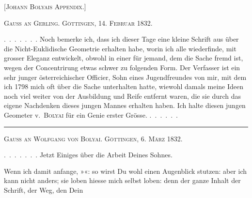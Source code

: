 \clearpage
{}%
\begin{center}\Large\textsc{[Johann Bolyais Appendix.]}\end{center}
\bigskip
\begin{center}\textsc{Gauss an Gerling. Göttingen, 14. Februar 1832.}\end{center}
\mbox{.\ .\ .\ .\ .\ .\ .} Noch bemerke ich, dass ich dieser Tage eine kleine Schrift aus  über die Nicht-Euklidische Geometrie erhalten habe, worin ich alle  wiederfinde, mit grosser Eleganz entwickelt, obwohl in einer für jemand, dem die Sache fremd ist, wegen der Concentrirung etwas schwer zu folgenden Form. Der Verfasser ist ein sehr junger österreichischer Officier, Sohn eines Jugendfreundes von mir, mit dem ich 1798 mich oft über die Sache unterhalten hatte, wiewohl damals meine Ideen noch viel weiter von der Ausbildung und Reife entfernt waren, die sie durch das eigene Nachdenken dieses jungen Mannes erhalten haben. Ich halte diesen jungen Geometer v.~\textsc{Bolyai} für ein Genie erster Grösse. \mbox{.\ .\ .\ .\ .\ .}

\bigskip
\begin{center}\rule{.25\textwidth}{.3pt}\end{center}
\bigskip
\begin{center}\textsc{Gauss an Wolfgang von Bolyai. Göttingen, 6. März 1832.}\end{center}
\mbox{.\ .\ .\ .\ .\ .\ .} Jetzt Einiges über die Arbeit Deines Sohnes.

Wenn ich damit anfange, »«: so wirst Du wohl einen Augenblick stutzen: aber ich kann nicht anders; sie loben hiesse mich selbst loben: denn der ganze Inhalt der Schrift, der Weg, den Dein
